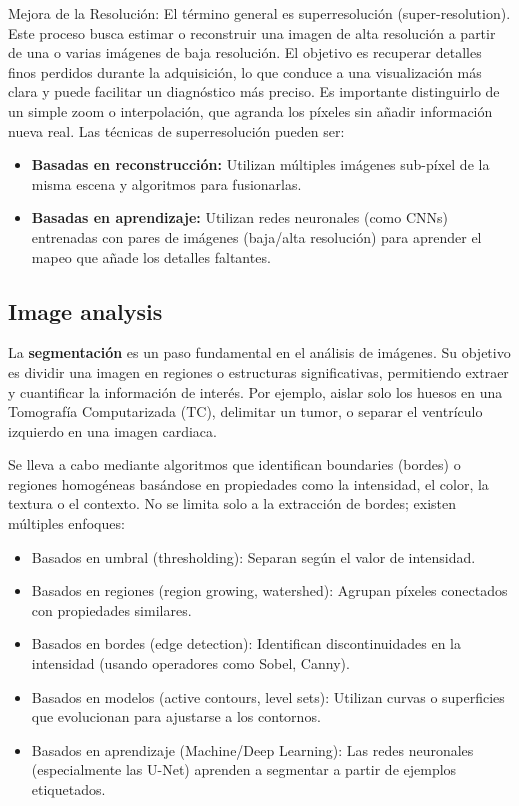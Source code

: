 Mejora de la Resolución: El término general es superresolución (super-resolution). Este proceso busca estimar o reconstruir una imagen de alta resolución a partir de una o varias imágenes de baja resolución. El objetivo es recuperar detalles finos perdidos durante la adquisición, lo que conduce a una visualización más clara y puede facilitar un diagnóstico más preciso. Es importante distinguirlo de un simple zoom o interpolación, que agranda los píxeles sin añadir información nueva real. Las técnicas de superresolución pueden ser:
\begin{itemize}
\item \textbf{Basadas en reconstrucción:} Utilizan múltiples imágenes sub-píxel de la misma escena y algoritmos para fusionarlas.
\item \textbf{Basadas en aprendizaje:} Utilizan redes neuronales (como CNNs) entrenadas con pares de imágenes (baja/alta resolución) para aprender el mapeo que añade los detalles faltantes.
\end{itemize}

\subsection{Image analysis}
La \textbf{segmentación} es un paso fundamental en el análisis de imágenes. Su objetivo es dividir una imagen en regiones o estructuras significativas, permitiendo extraer y cuantificar la información de interés. Por ejemplo, aislar solo los huesos en una Tomografía Computarizada (TC), delimitar un tumor, o separar el ventrículo izquierdo en una imagen cardiaca.

Se lleva a cabo mediante algoritmos que identifican boundaries (bordes) o regiones homogéneas basándose en propiedades como la intensidad, el color, la textura o el contexto. No se limita solo a la extracción de bordes; existen múltiples enfoques:
\begin{itemize}
\item Basados en umbral (thresholding): Separan según el valor de intensidad.
\item Basados en regiones (region growing, watershed): Agrupan píxeles conectados con propiedades similares.
\item Basados en bordes (edge detection): Identifican discontinuidades en la intensidad (usando operadores como Sobel, Canny).
\item Basados en modelos (active contours, level sets): Utilizan curvas o superficies que evolucionan para ajustarse a los contornos.
\item Basados en aprendizaje (Machine/Deep Learning): Las redes neuronales (especialmente las U-Net) aprenden a segmentar a partir de ejemplos etiquetados.
\end{itemize}

